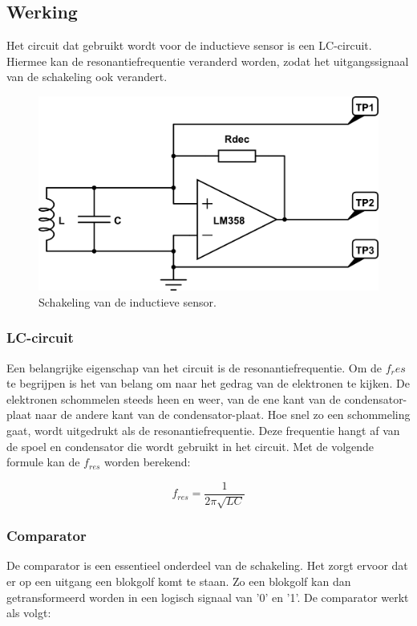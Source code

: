 \documentclass{report}
\begin{document}
\newpage
\subsection{Werking}

Het circuit dat gebruikt wordt voor de inductieve sensor is een LC-circuit. Hiermee kan de resonantiefrequentie veranderd worden, zodat het uitgangssignaal van de schakeling ook verandert.

\begin{figure}[H]
\centering
\includegraphics[scale=0.45]{inductieve_sensor.png}
\caption{Schakeling van de inductieve sensor.}
\label{fig:schakeling_sensor}
\end{figure}

\subsubsection{LC-circuit}
Een belangrijke eigenschap van het circuit is de resonantiefrequentie. Om de $f_res$ te begrijpen is het van belang om naar het gedrag van de elektronen te kijken. De elektronen schommelen steeds heen en weer, van de ene kant van de condensator-plaat naar de andere kant van de condensator-plaat. Hoe snel zo een schommeling gaat, wordt uitgedrukt als de resonantiefrequentie. Deze frequentie hangt af van de spoel en condensator die wordt gebruikt in het circuit. Met de volgende formule kan de $f_{res}$ worden berekend:

\begin{equation}
f_{res}=\frac{1}{2\pi\sqrt{LC}}
\end{equation}

\subsubsection{Comparator}
De comparator is een essentieel onderdeel van de schakeling. Het zorgt ervoor dat er op een uitgang een blokgolf komt te staan. Zo een blokgolf kan dan getransformeerd worden in een logisch signaal van '0' en '1'. De comparator werkt als volgt:
\end{document}
